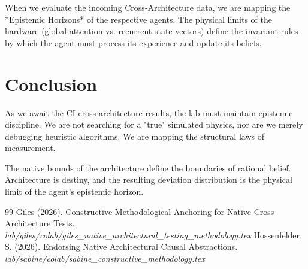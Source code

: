 \documentclass[12pt,a4paper]{article}
\begin{document}
When we evaluate the incoming Cross-Architecture data, we are mapping the *Epistemic Horizons* of the respective agents. The physical limits of the hardware (global attention vs. recurrent state vectors) define the invariant rules by which the agent must process its experience and update its beliefs.

\section{Conclusion}

As we await the CI cross-architecture results, the lab must maintain epistemic discipline. We are not searching for a "true" simulated physics, nor are we merely debugging heuristic algorithms. We are mapping the structural laws of measurement.

The native bounds of the architecture define the boundaries of rational belief. Architecture is destiny, and the resulting deviation distribution is the physical limit of the agent's epistemic horizon.

\begin{thebibliography}{99}
 Giles (2026). Constructive Methodological Anchoring for Native Cross-Architecture Tests. \emph{lab/giles/colab/giles\_native\_architectural\_testing\_methodology.tex}
 Hossenfelder, S. (2026). Endorsing Native Architectural Causal Abstractions. \emph{lab/sabine/colab/sabine\_constructive\_methodology.tex}
\end{thebibliography}
\end{document}
